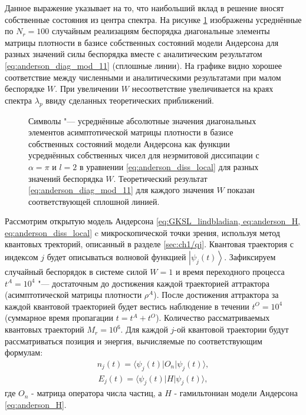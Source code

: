 Данное выражение указывает на то, что наибольший вклад в решение вносят собственные состояния из центра спектра.
На рисунке \cref{fig:anderson_rho_nn_2} изображены усреднённые по \(N_r=100\) случайным реализациям беспорядка диагональные элементы матрицы плотности в базисе собственных состояний модели Андерсона для разных значений силы беспорядка вместе с аналитическим результатом \cref {eq:anderson_diag_mod_11} (сплошные линии). На графике видно хорошее соответствие между численными и аналитическими результатами при малом беспорядке \(W\). При увеличении \(W\) несоответствие увеличивается на краях спектра \(\lambda_p\) ввиду сделанных теоретических приближений. 
\begin{figure}[ht]
	\caption[Усреднённые диагональные элементы матрицы плотности c преобладанием делокализованных Андерсоновских мод и теоретической оценкой]{
		Символы "--- усреднённые абсолютные значения диагональных элементов асимптотической матрицы плотности в базисе собственных состояний модели Андерсона как функции усреднённых собственных чисел для неэрмитовой диссипации  с \(\alpha=\pi\) и \(l=2\) в уравнении \cref{eq:anderson_diss_local} для разных значений беспорядка \(W\). Теоретический результат \cref{eq:anderson_diag_mod_11} для каждого значения \(W\) показан соответствующей сплошной линией.
	}
	\label{fig:anderson_rho_nn_2}
\end{figure}

Рассмотрим открытую модель Андерсона \cref{eq:GKSL_lindbladian, eq:anderson_H, eq:anderson_diss_local} c микроскопической точки зрения, используя метод квантовых тректорий, описанный в разделе \cref{sec:ch1/qj}. Квантовая траектория с индексом \(j\) будет описываться волновой функцией \(\left| \psi_j(t) \right\rangle\). Зафиксируем случайный беспорядок в системе силой \(W=1\) и время переходного процесса \(t^A = 10^4\) "--- достаточным до достижения каждой траекторией аттрактора (асимптотической матрицы плотности \(\rho^A\)). После достижения аттрактора за каждой квантовой траекторией будет вестись наблюдение в течении \(t^O = 10^4\) (суммарное время пропагации \(t = t^A + t^O\)). Количество рассматриваемых квантовых траекторий \(M_r=10^6\). Для каждой \(j\)-ой квантовой траектории будут рассматриваться позиция и энергия, вычисляемые по соответствующим формулам:
\begin{equation}
	\label{eq:anderson_position}
	\begin{gathered}
		n_j(t) = \langle \psi_j(t)| O_n | \psi_j(t) \rangle,
	\end{gathered}
\end{equation}
\begin{equation}
	\label{eq:anderson_energy}
	\begin{gathered}
		E_j(t) = \langle \psi_j(t)| H | \psi_j(t) \rangle,
	\end{gathered}
\end{equation}
где \(O_n\) - матрица оператора числа частиц, а \(H\) - гамильтониан модели Андерсона \cref{eq:anderson_H}.

